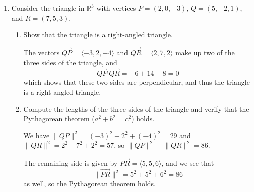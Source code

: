 \documentclass[12pt]{article}
\newcommand{\points}[1]{\marginpar{\hspace{24pt}[#1]}}
\newcommand{\R}{\mathbb{R}}
\newcommand{\dotp}{\boldsymbol{\cdot}}
\newcommand{\len}[1]{\lVert #1\rVert}
\begin{document}
\begin{enumerate}
\newpage

\item Consider the triangle in $\R^3$ with vertices $P=(2,0,-3)$, $Q=(5,-2,1)$, and $R=(7,5,3)$.
\begin{enumerate}
 \item Show that the triangle is a right-angled triangle. \points{3}

\bigskip

The vectors $\overrightarrow{QP}=\langle -3,2,-4\rangle$ and $\overrightarrow{QR} = \langle 2,7,2\rangle$ make up two of the three sides of the triangle, and
\[
 \overrightarrow{QP}\dotp\overrightarrow{QR} = -6+14-8 = 0
\]
which shows that these two sides are perpendicular, and thus the triangle is a right-angled triangle.

\bigskip



 \item Compute the lengths of the three sides of the triangle and verify that the Pythagorean theorem ($a^2+b^2=c^2$) holds. \points{2}

 We have $\len{QP}^2 = (-3)^2+2^2+(-4)^2 = 29$ and $\len{QR}^2 = 2^2+7^2+2^2 = 57$, so $\len{QP}^2+\len{QR}^2 = 86$.

 The remaining side is given by $\overrightarrow{PR}=\langle 5,5,6\rangle$, and we see that
\[
 \len{\overrightarrow{PR}}^2 = 5^2+5^2+6^2 = 86
\]
as well, so the Pythagorean theorem holds.


\end{enumerate}
 
\end{enumerate}
\end{document}
